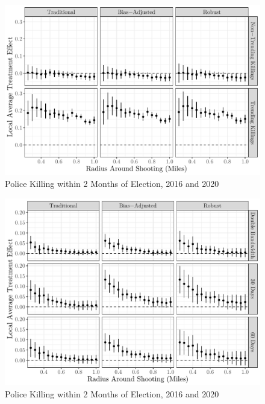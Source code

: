 \documentclass[
  12pt,
]{article}
\begin{document}
\begin{figure}[h]

{\centering \includegraphics{shoot_to_files/figure-latex/trend-1} 

}

\caption{\label{fig:map}Police Killing within 2 Months of Election, 2016 and 2020}\label{fig:trend}
\end{figure}

\begin{figure}[h]

{\centering \includegraphics{shoot_to_files/figure-latex/bws-1} 

}

\caption{\label{fig:map}Police Killing within 2 Months of Election, 2016 and 2020}\label{fig:bws}
\end{figure}
\end{document}
